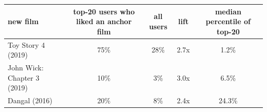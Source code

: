 \begin{tabular}{lcccc}
\toprule
new film & top-20 users who liked an anchor film & all users & lift & median percentile of top-20 \\
\midrule
Toy Story 4 (2019) & 75\% & 28\% & 2.7x & 1.2\% \\
John Wick: Chapter 3 (2019) & 10\% & 3\% & 3.0x & 6.5\% \\
Dangal (2016) & 20\% & 8\% & 2.4x & 24.3\% \\
\bottomrule
\end{tabular}
